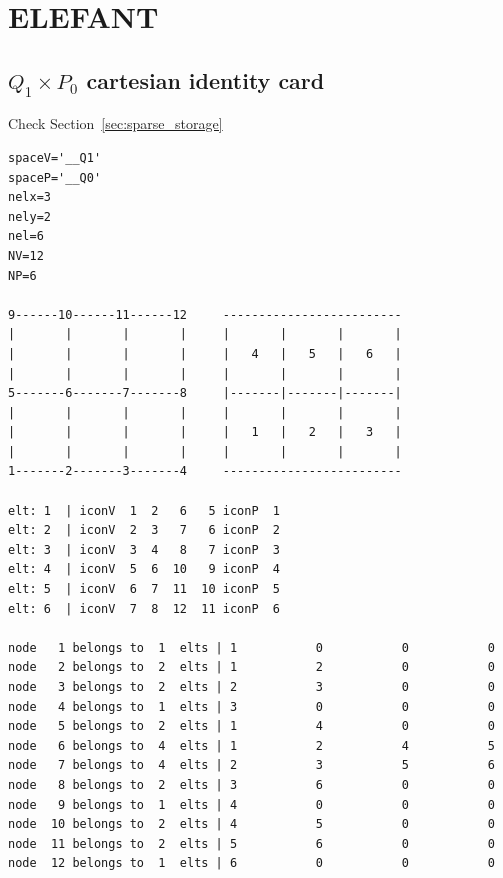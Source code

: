\section{ELEFANT} %





























\newpage
\subsection{$Q_1\times P_0$ cartesian identity card}

Check Section~\ref{sec:sparse_storage}

\begin{small}
\begin{verbatim}
spaceV='__Q1'
spaceP='__Q0'
nelx=3
nely=2
nel=6
NV=12
NP=6

9------10------11------12     -------------------------
|       |       |       |     |       |       |       |
|       |       |       |     |   4   |   5   |   6   |
|       |       |       |     |       |       |       |
5-------6-------7-------8     |-------|-------|-------|
|       |       |       |     |       |       |       |
|       |       |       |     |   1   |   2   |   3   |
|       |       |       |     |       |       |       | 
1-------2-------3-------4     ------------------------- 

elt: 1  | iconV  1  2   6   5 iconP  1
elt: 2  | iconV  2  3   7   6 iconP  2
elt: 3  | iconV  3  4   8   7 iconP  3
elt: 4  | iconV  5  6  10   9 iconP  4
elt: 5  | iconV  6  7  11  10 iconP  5
elt: 6  | iconV  7  8  12  11 iconP  6

node   1 belongs to  1  elts | 1           0           0           0
node   2 belongs to  2  elts | 1           2           0           0
node   3 belongs to  2  elts | 2           3           0           0
node   4 belongs to  1  elts | 3           0           0           0
node   5 belongs to  2  elts | 1           4           0           0
node   6 belongs to  4  elts | 1           2           4           5
node   7 belongs to  4  elts | 2           3           5           6
node   8 belongs to  2  elts | 3           6           0           0
node   9 belongs to  1  elts | 4           0           0           0
node  10 belongs to  2  elts | 4           5           0           0
node  11 belongs to  2  elts | 5           6           0           0
node  12 belongs to  1  elts | 6           0           0           0

\end{verbatim}
\end{small}




